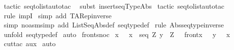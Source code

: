 \begin{isabellebody}
%
\isadelimproof
%
\endisadelimproof
%
\isatagproof
{}\isamarkupfalse%
\ {\isacharparenleft}tactic\ {\isacharverbatimopen}seq{\isacharunderscore}to{\isacharunderscore}list{\isacharunderscore}auto{\isacharunderscore}tac\ {}{\isacharverbatimclose}{\isacharparenright}\isanewline
{}\isamarkupfalse%
\ {\isacharparenleft}subst\ insertseq{\isacharunderscore}TypeAbs{\isacharparenright}\isanewline
{}\isamarkupfalse%
\ {\isacharparenleft}tactic\ {\isacharverbatimopen}seq{\isacharunderscore}to{\isacharunderscore}list{\isacharunderscore}auto{\isacharunderscore}tac\ {}{\isacharverbatimclose}{\isacharparenright}\isanewline
{}\isamarkupfalse%
\ {\isacharparenleft}rule\ impI{\isacharparenright}\isanewline
{}\isamarkupfalse%
\ {\isacharparenleft}simp\ add{\isacharcolon}\ TARep{\isacharunderscore}inverse{\isacharparenright}\isanewline
{}\isamarkupfalse%
\ {\isacharparenleft}simp\ {\isacharparenleft}no{\isacharunderscore}asm{\isacharunderscore}simp{\isacharparenright}\ add{\isacharcolon}\ ListSeqAbs{\isacharunderscore}def\ seqtype{\isacharunderscore}def{\isacharparenright}\isanewline
{}\isamarkupfalse%
\ {\isacharparenleft}rule\ Abs{\isacharunderscore}seqtype{\isacharunderscore}inverse{\isacharparenright}\isanewline
{}\isamarkupfalse%
\ {\isacharparenleft}unfold\ seqtype{\isacharunderscore}def{\isacharparenright}\isanewline
{}\isamarkupfalse%
\ auto\isanewline
{}\isamarkupfalse%
%
\endisatagproof
{\isafoldproof}%
%
\isadelimproof
\isanewline
%
\endisadelimproof
\isanewline
{}\isamarkupfalse%
\ front{\isacharunderscore}snoc{\isacharcolon}\ \isanewline
{\isachardoublequoteopen}{\isacharbang}{\isacharbang}x\ {\isachardot}\ {\isacharbrackleft}{\isacharbar}\ x\ {\isacharcolon}\ seq\ Z{\isacharsemicolon}\ y\ {\isacharcolon}\ Z\ {\isacharbar}{\isacharbrackright}\ {\isacharequal}{\isacharequal}{\isachargreater}\ front{\isacharparenleft}x\ {\isacharpercent}{\isacharampersand}{\isacharcircum}\ {\isacharpercent}{\isacharless}\ y\ {\isacharpercent}{\isachargreater}{\isacharparenright}\ {\isacharequal}\ x\ {\isachardoublequoteclose}\isanewline
%
\isadelimproof
%
\endisadelimproof
%
\isatagproof
{}\isamarkupfalse%
\ {\isacharparenleft}cut{\isacharunderscore}tac\ aux{\isacharparenright}\isanewline
{}\isamarkupfalse%
\ auto\isanewline
{}\isamarkupfalse%
%
\endisatagproof
{\isafoldproof}%
%
\isadelimproof
\isanewline
%
\endisadelimproof
\isanewline

\end{isabellebody}
